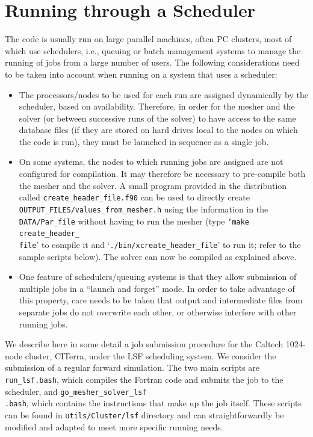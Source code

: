 \chapter{Running through a Scheduler}\label{cha:Running-Scheduler}

The code is usually run on large parallel machines, often PC clusters,
most of which use schedulers, i.e., queuing or batch management systems
to manage the running of jobs from a large number of users. The following
considerations need to be taken into account when running on a system
that uses a scheduler:

\begin{itemize}
\item The processors/nodes to be used for each run are assigned dynamically
by the scheduler, based on availability. Therefore, in order for the
mesher and the solver (or between successive runs of the solver) to
have access to the same database files (if they are stored on hard
drives local to the nodes on which the code is run), they must be
launched in sequence as a single job.
\item On some systems, the nodes to which running jobs are assigned are
not configured for compilation. It may therefore be necessary to pre-compile
both the mesher and the solver. A small program provided in the distribution
called \texttt{\small create\_header\_file.f90} can be used to directly
create\texttt{\small{} OUTPUT\_FILES/values\_from\_mesher.h} using
the information in the \texttt{\small DATA/Par\_file} without having
to run the mesher (type \texttt{\small `make}{\small{} }\texttt{\small create\_header\_}~\\
\texttt{\small file}' to compile it and `\texttt{\small ./bin/xcreate\_header\_file}'
to run it; refer to the sample scripts below). The solver can now
be compiled as explained above.
\item One feature of schedulers/queuing systems is that they allow submission
of multiple jobs in a {}``launch and forget'' mode. In order to
take advantage of this property, care needs to be taken that output
and intermediate files from separate jobs do not overwrite each other,
or otherwise interfere with other running jobs.
\end{itemize}
We describe here in some detail a job submission procedure for the
Caltech 1024-node cluster, CITerra, under the LSF scheduling system.
We consider the submission of a regular forward simulation. The two
main scripts are \texttt{\small run\_lsf.bash}, which compiles the
Fortran code and submits the job to the scheduler, and \texttt{\small go\_mesher\_solver\_lsf}~\\
\texttt{\small .bash}, which contains the instructions that make up
the job itself. These scripts can be found in \texttt{\small utils/Cluster/lsf}
directory and can straightforwardly be modified and adapted to meet
more specific running needs.


